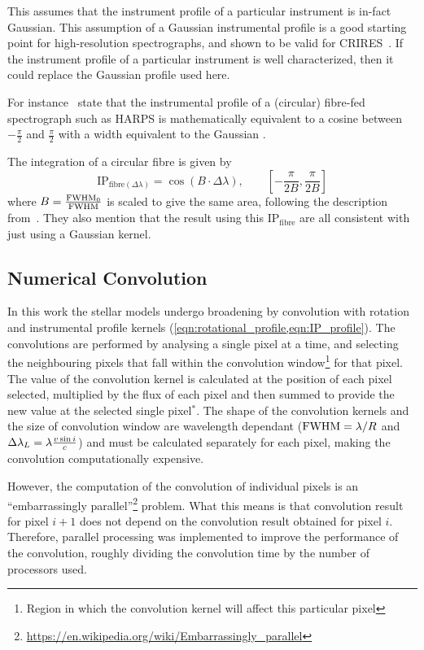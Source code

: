This assumes that the instrument profile of a particular instrument is in-fact Gaussian.
This assumption of a Gaussian instrumental profile is a good starting point for high-resolution spectrographs, and shown to be valid for CRIRES~\citep{seifahrt_synthesising_2010}.
If the instrument profile of a particular instrument is well characterized, then it could replace the Gaussian profile used here.

For instance~\citet{artigau_optical_2018}  state that the instrumental profile of a (circular) fibre-fed spectrograph such as {HARPS} is mathematically equivalent to a cosine between $-\frac{\pi}{2}$ and $\frac{\pi}{2}$ with a width equivalent to the Gaussian {\fwhm}.

The integration of a circular fibre is given by
\begin{equation}
\textrm{IP}_{\textrm{fibre}(\Delta\lambda)} = \cos(B\cdot\Delta\lambda) ,  \hspace{2em} [-\frac{\pi}{2 B}, \frac{\pi}{2 B}]
\end{equation}
where {$B = \frac{\textrm{FWHM}_{0}}{\textrm{FWHM}}$ } is scaled to give the same area,
following the description from~\citet{artigau_optical_2018}.
They also mention that the result using this $\textrm{IP}_{\textrm{fibre}}$ are all consistent with just using a Gaussian kernel.

\subsection{Numerical Convolution}
\label{subsec:numerical_convolution}
In this work the stellar models undergo broadening by convolution with rotation and instrumental profile kernels (\cref{eqn:rotational_profile,eqn:IP_profile}).
The convolutions are performed by analysing a single pixel at a time, and selecting the neighbouring pixels that fall within the convolution window\footnote{Region in which the convolution kernel will affect this particular pixel} for that pixel.
The value of the convolution kernel is calculated at the position of each pixel selected, multiplied by the flux of each pixel and then summed to provide the new value at the selected single pixel{$^{\textbf{*}}$}.
 The shape of the convolution kernels and the size of convolution window are wavelength dependant (${\textrm{FWHM}}=\lambda / R$ and $\Delta\lambda_{L}=\lambda \frac{v\sin{i}}{c}$) and must be calculated separately for each pixel, making the convolution computationally expensive.

However, the computation of the convolution of individual pixels is an ``embarrassingly parallel''\footnote{\href{https://en.wikipedia.org/wiki/Embarrassingly\_parallel}{https://en.wikipedia.org/wiki/Embarrassingly\_parallel}} problem.
What this means is that convolution result for pixel $i+1$ does not depend on the convolution result obtained for pixel $i$.
Therefore, parallel processing was implemented to improve the performance of the convolution, roughly dividing the convolution time by the number of processors used.


